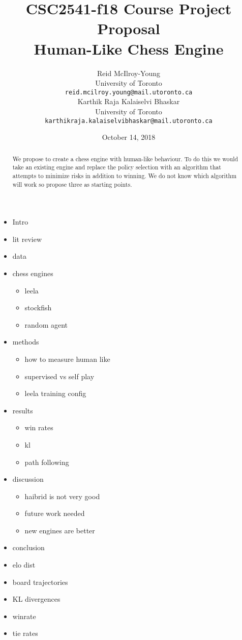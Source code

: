 \documentclass{article}
\title{CSC2541-f18 Course Project Proposal\\Human-Like Chess Engine}
\author{
	Reid McIlroy-Young\\
	University of Toronto\\
	\texttt{reid.mcilroy.young@mail.utoronto.ca} \\
	 \And
	 Karthik Raja Kalaiselvi Bhaskar \\
	 University of Toronto\\
	 \texttt{karthikraja.kalaiselvibhaskar@mail.utoronto.ca} \\
}
\date{October 14, 2018}
\begin{document}
\maketitle

\begin{abstract}
	We propose to create a chess engine with human-like behaviour. To do this we would take an existing engine and replace the policy selection with an algorithm that attempts to minimize risks in addition to winning. We do not know which algorithm will work so propose three as starting points.
\end{abstract}


\begin{itemize}
	\item Intro
	\item lit review
	\item data
	\item chess engines
	\begin{itemize}
		\item leela
		\item stockfish
		\item random agent
	\end{itemize}
	\item methods
	\begin{itemize}
		\item how to measure human like
		\item supervised vs self play
		\item leela training config
	\end{itemize}
	\item results
	\begin{itemize}
		\item win rates
		\item kl
		\item path following
	\end{itemize}
	\item discussion
	\begin{itemize}
		\item haibrid is not very good
		\item future work needed
		\item new engines are better
	\end{itemize}
	\item conclusion
\end{itemize}

\begin{itemize}
	\item elo dist
	\item board trajectories
	\item KL divergences 
	\item winrate
	\item tie rates
\end{itemize}
{}


\end{document}
